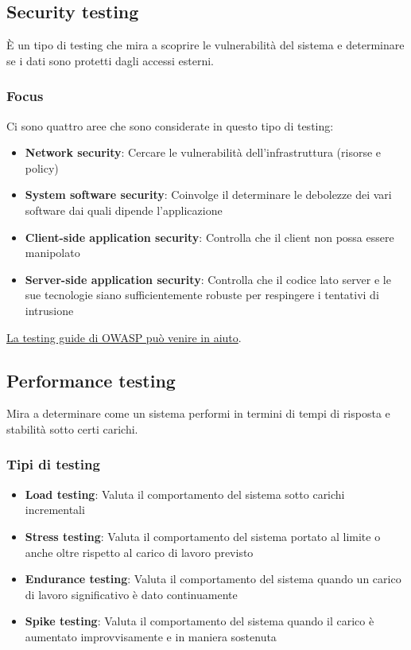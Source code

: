 \documentclass[11pt,a4paper]{book}
\begin{document}
\subsection{Security testing}
È un tipo di testing che mira a scoprire le vulnerabilità del sistema e determinare se i dati sono protetti dagli accessi esterni.

\subsubsection{Focus}
Ci sono quattro aree che sono considerate in questo tipo di testing:
\begin{itemize}
	\item \textbf{Network security}: Cercare le vulnerabilità dell'infrastruttura (risorse e policy)
	\item \textbf{System software security}: Coinvolge il determinare le debolezze dei vari software dai quali dipende l'applicazione
	\item \textbf{Client-side application security}: Controlla che il client non possa essere manipolato
	\item \textbf{Server-side application security}: Controlla che il codice lato server e le sue tecnologie siano sufficientemente robuste per respingere i tentativi di intrusione
\end{itemize}

\href{https://wiki.owasp.org/index.php/OWASP_Testing_Project}{La testing guide di OWASP può venire in aiuto}.

\subsection{Performance testing}
Mira a determinare come un sistema performi in termini di tempi di risposta e stabilità sotto certi carichi.

\subsubsection{Tipi di testing}
\begin{itemize}
	\item \textbf{Load testing}: Valuta il comportamento del sistema sotto carichi incrementali
	\item \textbf{Stress testing}: Valuta il comportamento del sistema portato al limite o anche oltre rispetto al carico di lavoro previsto
	\item \textbf{Endurance testing}: Valuta il comportamento del sistema quando un carico di lavoro significativo è dato continuamente
	\item \textbf{Spike testing}: Valuta il comportamento del sistema quando il carico è aumentato improvvisamente e in maniera sostenuta
\end{itemize}
\end{document}
